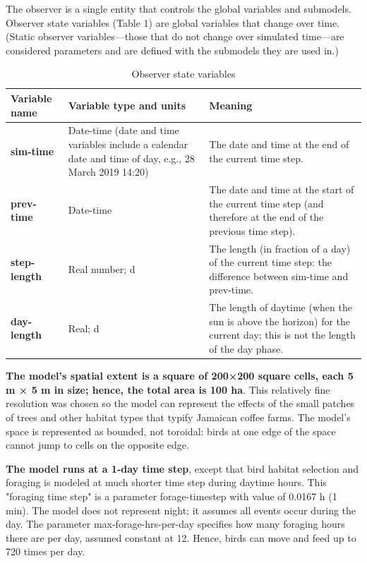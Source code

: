 \documentclass[
  man,
  10pt,
  a4paper,
  floatsintext
]{apa7}
\begin{document}

{
  \color{gddarkcornflowerblueb}
  The observer is a single entity that controls the global variables and submodels. Observer state variables (Table 1) are global variables that change over time. (Static observer variables—those that do not change over simulated time—are considered parameters and are defined with the submodels they are used in.)

  \smallskip

  \begin{table}[h]
    \footnotesize
    \color{gddarkcornflowerblueb}
    \centering
    \linespread{1.5}\selectfont
    \caption{Observer state variables}
    \begin{tabular}{ p{2.5cm} p{4cm} p{8cm} }
        \hline
        Variable name & Variable type and units & Meaning \\
        \hline
        \textbf{sim-time} &
        Date-time (date and time variables include a calendar date and time of day, e.g., 28 March 2019 14:20) &
        The date and time at the end of the current time step. \\
        \hline
        \textbf{prev-time} &
        Date-time &
        The date and time at the start of the current time step (and therefore at the end of the previous time step). \\
        \hline
        \textbf{step-length} &
        Real number; d &
        The length (in fraction of a day) of the current time step: the difference between sim-time and prev-time. \\
        \hline
        \textbf{day-length} &
        Real; d &
        The length of daytime (when the sun is above the horizon) for the current day; this is not the length of the day phase. \\
        \hline
    \end{tabular}
  \end{table}
}


{
  \color{gddarkpurpleb}
  \textbf{The model's spatial extent is a square of 200×200 square cells, each 5 m × 5 m in size; hence, the total area is 100 ha}. This relatively fine resolution was chosen so the model can represent the effects of the small patches of trees and other habitat types that typify Jamaican coffee farms. The model's space is represented as bounded, not toroidal: birds at one edge of the space cannot jump to cells on the opposite edge.

  \textbf{The model runs at a 1-day time step}, except that bird habitat selection and foraging is modeled at much shorter time step during daytime hours. This "foraging time step" is a parameter forage-timestep with value of 0.0167 h (1 min). The model does not represent night; it assumes all events occur during the day. The parameter max-forage-hrs-per-day specifies how many foraging hours there are per day, assumed constant at 12. Hence, birds can move and feed up to 720 times per day.
}
\end{document}
